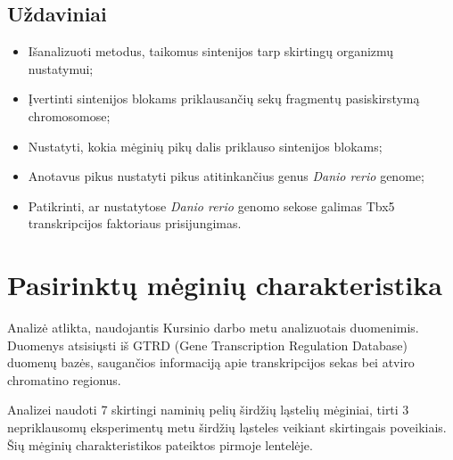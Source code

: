 \documentclass[12pt]{article}
\begin{document}
\subsection*{Uždaviniai}
\begin{itemize}
    \item Išanalizuoti metodus, taikomus sintenijos tarp skirtingų organizmų
          nustatymui;
    \item Įvertinti sintenijos blokams priklausančių sekų fragmentų
          pasiskirstymą chromosomose;
    \item Nustatyti, kokia mėginių pikų dalis priklauso sintenijos blokams;
    \item Anotavus pikus nustatyti pikus atitinkančius genus \emph{Danio rerio}
          genome;
    \item Patikrinti, ar nustatytose \emph{Danio rerio} genomo sekose galimas
          Tbx5 transkripcijos faktoriaus prisijungimas.
\end{itemize}

\newpage


\section{Pasirinktų mėginių charakteristika}
Analizė atlikta, naudojantis Kursinio darbo metu analizuotais duomenimis.
Duomenys atsisiųsti iš GTRD (Gene Transcription Regulation Database)\cite{GTRD}
duomenų bazės, saugančios informaciją apie transkripcijos sekas bei atviro
chromatino regionus.

Analizei naudoti 7 skirtingi naminių pelių širdžių ląstelių mėginiai, tirti 3
nepriklausomų eksperimentų metu širdžių ląsteles veikiant skirtingais
poveikiais. Šių mėginių charakteristikos pateiktos pirmoje lentelėje.
\end{document}
